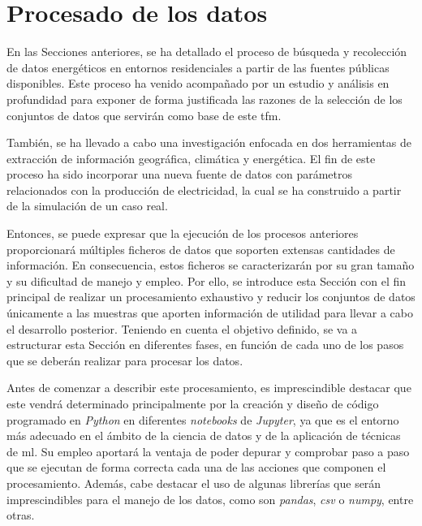 \section{Procesado de los datos}
\label{sec:preprocesado}

En las Secciones anteriores, se ha detallado el proceso de búsqueda y recolección de datos energéticos en entornos residenciales a partir de las fuentes públicas disponibles. Este proceso ha venido acompañado por un estudio y análisis en profundidad para exponer de forma justificada las razones de la selección de los conjuntos de datos que servirán como base de este \gls{tfm}. 

\vspace{3mm}

También, se ha llevado a cabo una investigación enfocada en dos herramientas de extracción de información geográfica, climática y energética. El fin de este proceso ha sido incorporar una nueva fuente de datos con parámetros relacionados con la producción de electricidad, la cual se ha construido a partir de la simulación de un caso real.

\vspace{3mm}

Entonces, se puede expresar que la ejecución de los procesos anteriores proporcionará múltiples ficheros de datos que soporten extensas cantidades de información. En consecuencia, estos ficheros se caracterizarán por su gran tamaño y su dificultad de manejo y empleo. Por ello, se introduce esta Sección con el fin principal de realizar un procesamiento exhaustivo y reducir los conjuntos de datos únicamente a las muestras que aporten información de utilidad para llevar a cabo el desarrollo posterior. Teniendo en cuenta el objetivo definido, se va a estructurar esta Sección en diferentes fases, en función de cada uno de los pasos que se deberán realizar para procesar los datos.

\vspace{3mm}

Antes de comenzar a describir este procesamiento, es imprescindible destacar que este vendrá determinado principalmente por la creación y diseño de código programado en \textit{Python} en diferentes \textit{notebooks} de \textit{Jupyter}, ya que es el entorno más adecuado en el ámbito de la ciencia de datos y de la aplicación de técnicas de \gls{ml}. Su empleo aportará la ventaja de poder depurar y comprobar paso a paso que se ejecutan de forma correcta cada una de las acciones que componen el procesamiento. Además, cabe destacar el uso de algunas librerías que serán imprescindibles para el manejo de los datos, como son \textit{pandas}, \textit{csv} o \textit{numpy}, entre otras.

